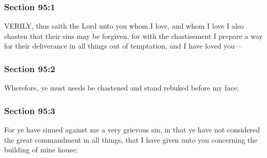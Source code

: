 	\subsubsection{Section 95:1} %
		\label{DC95-1}

		VERILY, thus saith the Lord unto you whom I love, and whom I love I also chasten that their sins may be forgiven, for with the chastisement I prepare a way for their deliverance in all things out of temptation, and I have loved you---


	\subsubsection{Section 95:2} %
		\label{DC95-2}

		Wherefore, ye must needs be chastened and stand rebuked before my face;


	\subsubsection{Section 95:3} %
		\label{DC95-3}

		For ye have sinned against me a very grievous sin, in that ye have not considered the great commandment in all things, that I have given unto you concerning the building of mine house;


